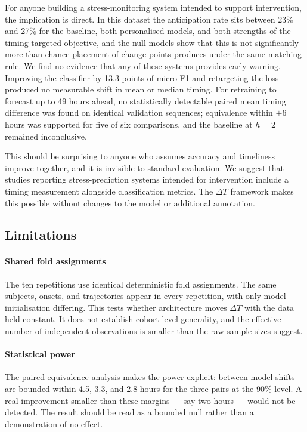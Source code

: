 \documentclass[preprint,12pt,authoryear]{elsarticle}
\newcommand{\dt}{$\Delta T$}
\begin{document}
For anyone building a stress-monitoring system intended to support
intervention, the implication is direct. In this dataset the
anticipation rate sits between 23\% and 27\% for the baseline, both
personalised models, and both strengths of the timing-targeted
objective, and the null models show that this is not significantly
more than chance placement of change points produces under the same
matching rule. We find no evidence that any of these systems provides
early warning. Improving the classifier by 13.3 points of micro-F1 and
retargeting the loss produced no measurable shift in mean or median
timing. For retraining to forecast up to 49 hours ahead, no
statistically detectable paired mean timing difference was found on
identical validation sequences; equivalence within $\pm 6$ hours was
supported for five of six comparisons, and the baseline at $h = 2$
remained inconclusive.

This should be surprising to anyone who assumes accuracy and timeliness
improve together, and it is invisible to standard evaluation. We suggest
that studies reporting stress-prediction systems intended for
intervention include a timing measurement alongside classification
metrics. The \dt{} framework makes this possible without changes to the
model or additional annotation.

\subsection{Limitations}
\label{sec:limits}

\paragraph{Shared fold assignments} The ten repetitions use identical
deterministic fold assignments. The same subjects, onsets, and
trajectories appear in every repetition, with only model initialisation
differing. This tests whether architecture moves \dt{} with the data
held constant. It does not establish cohort-level generality, and the
effective number of independent observations is smaller than the raw
sample sizes suggest.

\paragraph{Statistical power} The paired equivalence analysis makes
the power explicit: between-model shifts are bounded within 4.5, 3.3,
and 2.8 hours for the three pairs at the 90\% level. A real
improvement smaller than these margins --- say two hours --- would not
be detected. The result should be read as a bounded null rather than a
demonstration of no effect.
\end{document}
